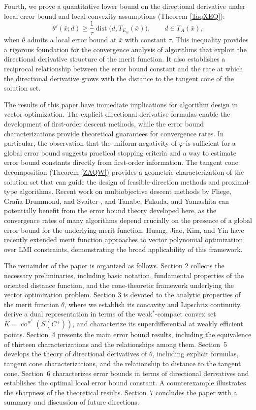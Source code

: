 \documentclass[11pt]{article}
\begin{document}
Fourth, we prove a quantitative lower bound on the directional derivative under local error bound and local convexity assumptions (Theorem \ref{TaqXEQ}):
\[
\theta'(\bar x;d)\ge \frac{1}{\tau}\operatorname{dist}\bigl(d,T_{E_w}(\bar x)\bigr),\qquad d\in T_A(\bar x),
\]
when \(\theta\) admits a local error bound at \(\bar x\) with constant \(\tau\). This inequality   provides a rigorous foundation for the convergence analysis of algorithms that exploit the directional derivative structure of the merit function. It also establishes a reciprocal relationship between the error bound constant and the rate at which the directional derivative grows with the distance to the tangent cone of the solution set.

The results of this paper have immediate implications for algorithm design in vector optimization. The explicit directional derivative formulas enable the development of first-order descent methods, while the error bound characterizations provide theoretical guarantees for convergence rates.  In particular, the observation that the uniform negativity of \(\varphi\) is sufficient for a global error bound suggests practical stopping criteria and a way to estimate error bound constants directly from first-order information. The tangent cone decomposition (Theorem \ref{ZAQW}) provides a geometric characterization of the solution set that can guide the design of feasible-direction methods and proximal-type algorithms. Recent work on multiobjective descent methods by Fliege, Gra\~na Drummond, and Svaiter \cite{Fliege}, and Tanabe, Fukuda, and Yamashita \cite{TanabeProx}  can potentially benefit from the error bound theory developed here, as the convergence rates of many algorithms depend crucially on the presence of a global error bound for the underlying merit function. Huang, Jiao, Kim, and Yin \cite{HJKY2026} have recently extended merit function approaches to vector polynomial optimization over LMI constraints, demonstrating the broad applicability of this framework.

 The remainder of the paper is organized as follows. Section 2 collects the necessary preliminaries, including basic notation, fundamental properties of the  oriented distance function, and the cone-theoretic framework underlying the vector optimization problem.
  Section 3 is devoted to the analytic properties of the merit function \(\theta\), where we establish its concavity and Lipschitz continuity, derive a dual representation in terms of the weak\(^*\)-compact convex set \(K = \overline{\operatorname{co}}^{w^*}(S(C^+))\), and characterize its superdifferential at weakly efficient points. Section~4 presents the main error bound results, including the equivalence of thirteen characterizations and the relationships among them. Section~5 develops the theory of directional derivatives of \(\theta\), including explicit formulas, tangent cone characterizations, and the relationship to distance to the tangent cone. Section~6 characterizes error bounds in terms of directional derivatives and establishes the optimal local error bound constant. A counterexample illustrates the sharpness of the theoretical results. Section~7 concludes the paper with a summary and discussion of future directions.
\end{document}
